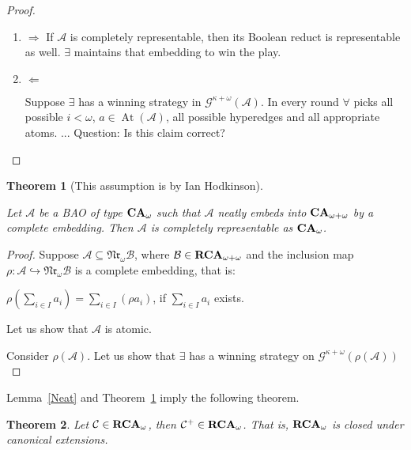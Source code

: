 \documentclass[a4paper]{article}
\theoremstyle{defin}
\theoremstyle{theorem}
\newtheorem{theorem}{Theorem}
\theoremstyle{prop}
\theoremstyle{lemma}
\theoremstyle{fact}
\theoremstyle{ex}
\theoremstyle{col}
\begin{document}
\begin{proof}
  $ $

  \begin{enumerate}
    \item $\Rightarrow$
    If $\mathcal{A}$ is completely representable, then its Boolean reduct is representable as well. $\exists$ maintains that embedding to win the play.

    \item $\Leftarrow$

    Suppose $\exists$ has a winning strategy in $\mathcal{G}^{\kappa + \omega}(\mathcal{A})$.
    In every round $\forall$ picks all possible $i < \omega$, $a \in \operatorname{At}(\mathcal{A})$, all possible hyperedges and all appropriate atoms.
    ...
    Question: Is this claim correct?
  \end{enumerate}
\end{proof}

\begin{theorem}[This assumption is by Ian Hodkinson]\label{Neat2}
  $ $

  Let $\mathcal{A}$ be a BAO of type ${\bf CA}_{\omega}$ such that $\mathcal{A}$ neatly embeds into ${\bf CA}_{\omega + \omega}$ by a complete embedding. Then $\mathcal{A}$ is completely representable as ${\bf CA}_{\omega}$.
\end{theorem}

\begin{proof}
  Suppose $\mathcal{A} \subseteq \mathfrak{Nr}_{\omega} \mathcal{B}$, where $\mathcal{B} \in {\bf RCA}_{\omega + \omega}$ and the inclusion map $\rho : \mathcal{A} \hookrightarrow \mathfrak{Nr}_{\omega} \mathcal{B}$ is a complete embedding, that is:
  \begin{center}
    $\rho (\sum \limits_{i \in I} a_i) = \sum \limits_{i \in I} (\rho a_i)$, if $\sum \limits_{i \in I} a_i$ exists.
  \end{center}

  Let us show that $\mathcal{A}$ is atomic.

  Consider $\rho(\mathcal{A})$. Let us show that $\exists$ has a winning strategy on $\mathcal{G}^{\kappa + \omega}(\rho(\mathcal{A}))$
\end{proof}

Lemma~\ref{Neat} and Theorem~\ref{Neat2} imply the following theorem.

\begin{theorem}
  Let $\mathcal{C} \in {\bf RCA}_{\omega}$, then $\mathcal{C}^{+} \in {\bf RCA}_{\omega}$. That is, ${\bf RCA}_{\omega}$ is closed under canonical extensions.
\end{theorem}
\end{document}
